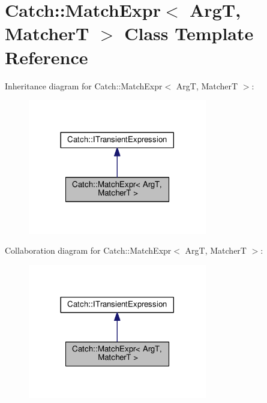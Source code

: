 \hypertarget{classCatch_1_1MatchExpr}{}\section{Catch\+:\+:Match\+Expr$<$ ArgT, MatcherT $>$ Class Template Reference}
\label{classCatch_1_1MatchExpr}


Inheritance diagram for Catch\+:\+:Match\+Expr$<$ ArgT, MatcherT $>$\+:
\nopagebreak
\begin{figure}[H]
\begin{center}
\leavevmode
\includegraphics[width=221pt]{classCatch_1_1MatchExpr__inherit__graph}
\end{center}
\end{figure}


Collaboration diagram for Catch\+:\+:Match\+Expr$<$ ArgT, MatcherT $>$\+:
\nopagebreak
\begin{figure}[H]
\begin{center}
\leavevmode
\includegraphics[width=221pt]{classCatch_1_1MatchExpr__coll__graph}
\end{center}
\end{figure}
